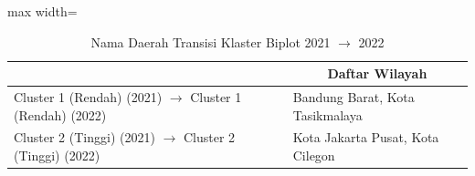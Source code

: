 \begin{table}[H]
\centering
\caption{Nama Daerah Transisi Klaster Biplot 2021 \(\rightarrow\) 2022} \label{tab:sample1biplot_trans_name_2021x2022}
\begin{adjustbox}{max width=\textwidth}
\begin{tabular}{|>{\centering\arraybackslash}p{4cm}|p{10cm}|}
\hline
\multicolumn{1}{|c|}{\textbf{Kategori}} & \multicolumn{1}{c|}{\textbf{Daftar Wilayah}} \\
\hline
Cluster 1 (Rendah) (2021) \(\rightarrow\) Cluster 1 (Rendah) (2022) & Bandung Barat, Kota Tasikmalaya \\
\hline
Cluster 2 (Tinggi) (2021) \(\rightarrow\) Cluster 2 (Tinggi) (2022) & Kota Jakarta Pusat, Kota Cilegon \\
\hline
\end{tabular}
\end{adjustbox}
\end{table}